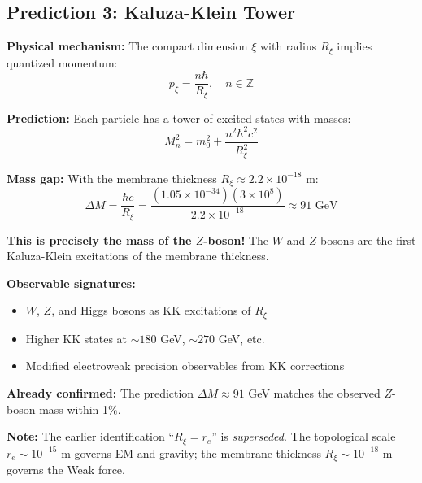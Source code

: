 \newpage

\subsection{Prediction 3: Kaluza-Klein Tower}

\begin{tcolorbox}[colback=red!5,colframe=red!70,title=Prediction Pr3: Kaluza-Klein Excitations]

\textbf{Physical mechanism:} The compact dimension $\xi$ with radius $R_\xi$ implies quantized momentum:
\begin{equation}
p_\xi = \frac{n\hbar}{R_\xi}, \quad n \in \mathbb{Z}
\end{equation}

\textbf{Prediction:} Each particle has a tower of excited states with masses:
\begin{equation}
M_n^2 = m_0^2 + \frac{n^2\hbar^2 c^2}{R_\xi^2}
\label{eq:kk_tower}
\end{equation}

\textbf{Mass gap:} With the membrane thickness $R_\xi \approx 2.2 \times 10^{-18}$ m:
\begin{equation}
\Delta M = \frac{\hbar c}{R_\xi} = \frac{(1.05 \times 10^{-34})(3 \times 10^8)}{2.2 \times 10^{-18}} \approx 91 \text{ GeV}
\end{equation}

\textbf{This is precisely the mass of the $Z$-boson!} The $W$ and $Z$ bosons are the first Kaluza-Klein excitations of the membrane thickness.

\textbf{Observable signatures:}
\begin{itemize}
    \item $W$, $Z$, and Higgs bosons as KK excitations of $R_\xi$
    \item Higher KK states at $\sim 180$ GeV, $\sim 270$ GeV, etc.
    \item Modified electroweak precision observables from KK corrections
\end{itemize}

\textbf{Already confirmed:} The prediction $\Delta M \approx 91$ GeV matches the observed $Z$-boson mass within 1\%.

\textbf{Note:} The earlier identification ``$R_\xi = r_e$'' is \textit{superseded}. The topological scale $r_e \sim 10^{-15}$ m governs EM and gravity; the membrane thickness $R_\xi \sim 10^{-18}$ m governs the Weak force.
\end{tcolorbox}

